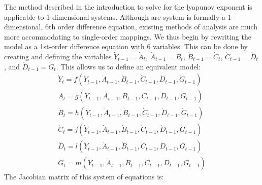The method described in the introduction to solve for the lyapunov exponent is applicable to 1-dimensional systems. Although are system is formally a 1-dimensional, 6th order difference equation, existing methods of analysis are much more accommodating to single-order mappings. We thus begin by rewriting the model as a 1st-order difference equation with 6 variables. This can be done by creating and defining the variables $\dot Y_{t-1}=\dot A_t$, $\dot A_{t-1}=\dot B_{t}$, $\dot B_{t-1}=\dot C_{t}$, $\dot C_{t-1}=\dot D_{t}$, and $\dot D_{t-1}=\dot G_{t}$. This allows us to define an equivalent model:
\begin{align*}
    \dot Y_t = f(\dot Y_{t-1}, \dot A_{t-1}, \dot B_{t-1}, \dot C_{t-1}, \dot D_{t-1}, \dot G_{t-1})\\
    \dot A_t = g(\dot Y_{t-1}, \dot A_{t-1}, \dot B_{t-1}, \dot C_{t-1}, \dot D_{t-1}, \dot G_{t-1})\\
    \dot B_t = h(\dot Y_{t-1}, \dot A_{t-1}, \dot B_{t-1}, \dot C_{t-1}, \dot D_{t-1}, \dot G_{t-1})\\
    \dot C_t = j(\dot Y_{t-1}, \dot A_{t-1}, \dot B_{t-1}, \dot C_{t-1}, \dot D_{t-1}, \dot G_{t-1})\\
    \dot D_t = l(\dot Y_{t-1}, \dot A_{t-1}, \dot B_{t-1}, \dot C_{t-1}, \dot D_{t-1}, \dot G_{t-1})\\
    \dot G_t = m(\dot Y_{t-1}, \dot A_{t-1}, \dot B_{t-1}, \dot C_{t-1}, \dot D_{t-1}, \dot G_{t-1})
\end{align*}
The Jacobian matrix of this system of equations is:
